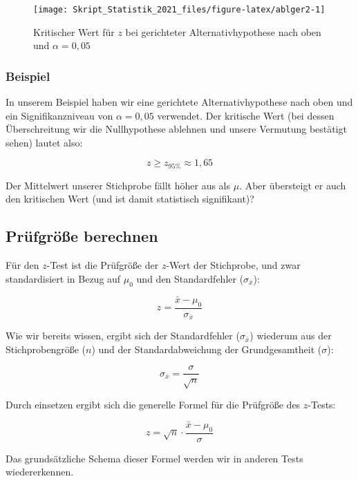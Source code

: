 \documentclass[
  11pt,
  ngerman,
  a4paper,
]{report}
\begin{document}
\begin{figure}[!h]

{\centering \texttt{[image: Skript\_Statistik\_2021\_files/figure-latex/ablger2-1]} 

}

\caption{Kritischer Wert für $z$ bei gerichteter Alternativhypothese nach oben und $\alpha=0{,}05$}\label{fig:ablger2}
\end{figure}

\hypertarget{beispiel-3}{%
\subsubsection{Beispiel}\label{beispiel-3}}

In unserem Beispiel haben wir eine gerichtete Alternativhypothese nach oben und ein Signifikanzniveau von \(\alpha=0{,}05\) verwendet. Der kritische Wert (bei dessen Überschreitung wir die Nullhypothese ablehnen und unsere Vermutung bestätigt sehen) lautet also:

\[
z \geq z_{95\%}\approx 1{,}65
\]

Der Mittelwert unserer Stichprobe fällt höher aus als \(\mu\). Aber übersteigt er auch den kritischen Wert (und ist damit statistisch signifikant)?

\hypertarget{pruxfcfgruxf6uxdfe-berechnen}{%
\subsection{Prüfgröße berechnen}\label{pruxfcfgruxf6uxdfe-berechnen}}

Für den \(z\)-Test ist die Prüfgröße der \(z\)-Wert der Stichprobe, und zwar standardisiert in Bezug auf \(\mu_0\) und den Standardfehler (\(\sigma_{\bar{x}}\)):

\[
z=\frac{\bar{x}-\mu_0}{\sigma_{\bar{x}}}
\label{eq:trans}
\]

Wie wir bereits wissen, ergibt sich der Standardfehler (\(\sigma_{\bar{x}}\)) wiederum aus der Stichprobengröße (\(n\)) und der Standardabweichung der Grundgesamtheit (\(\sigma\)):

\[
\sigma_{\bar{x}}=\frac{\sigma}{\sqrt{n}}
\label{eq:serr}
\]

Durch einsetzen ergibt sich die generelle Formel für die Prüfgröße des \(z\)-Tests:

\[
z=\sqrt{n}\cdot\frac{\bar{x}-\mu_0}{\sigma}
\label{eq:5z}
\]

Das grundsätzliche Schema dieser Formel werden wir in anderen Tests wiedererkennen.
\end{document}
